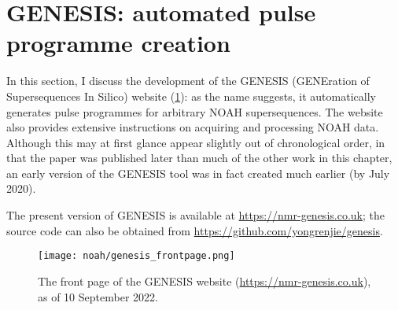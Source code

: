 \section{GENESIS: automated pulse programme creation}
\label{sec:noah__genesis}

In this section, I discuss the development of the GENESIS (GENEration of Supersequences In Silico) website (\cref{fig:genesis_frontpage}): as the name suggests, it automatically generates pulse programmes for arbitrary NOAH supersequences.
The website also provides extensive instructions on acquiring and processing NOAH data.
Although this may at first glance appear slightly out of chronological order, in that the paper\autocite{Yong2022AC} was published later than much of the other work in this chapter, an early version of the GENESIS tool was in fact created much earlier (by July 2020).

The present version of GENESIS is available at \url{https://nmr-genesis.co.uk}; the source code can also be obtained from \url{https://github.com/yongrenjie/genesis}.

\begin{figure}[!ht]
    \centering
    \texttt{[image: noah/genesis\_frontpage.png]}%
    \caption[Front page of the GENESIS website]{
        The front page of the GENESIS website (\url{https://nmr-genesis.co.uk}), as of 10 September 2022.
    }
    \label{fig:genesis_frontpage}
\end{figure}




